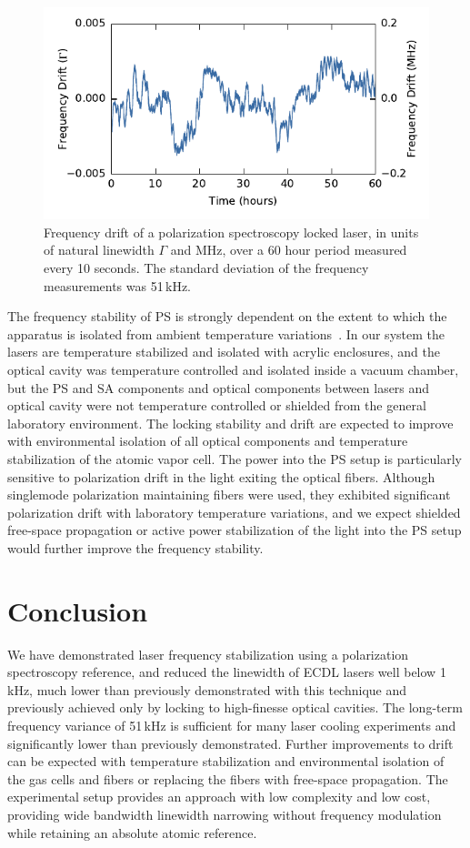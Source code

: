 \documentclass[10pt,letterpaper]{article}
\begin{document}
\begin{figure}[htbp]
\centering
\includegraphics{scholten_fig5.pdf}
\caption{Frequency drift of a polarization spectroscopy locked laser, in units of natural linewidth $\Gamma$ and MHz, over a 60 hour period measured every 10 seconds.
The standard deviation of the frequency measurements was 51\,kHz.}
\label{fig:drift}
\end{figure}

The frequency stability of PS is strongly dependent on the extent to which the apparatus is isolated from ambient temperature variations~\cite{yoshikawa_frequency_2003}.
In our system the lasers are temperature stabilized and isolated with acrylic enclosures, and the optical cavity was temperature controlled and isolated inside a vacuum chamber, but the PS and SA components and optical components between lasers and optical cavity were not temperature controlled or shielded from the general laboratory environment.
The locking stability and drift are expected to improve with environmental isolation of all optical components and temperature stabilization of the atomic vapor cell.
The power into the PS setup is particularly sensitive to polarization drift in the light exiting the optical fibers.
Although singlemode polarization maintaining fibers were used, they exhibited significant polarization drift with laboratory temperature variations, and we expect shielded free-space propagation or active power stabilization of the light into the PS setup would further improve the frequency stability.


\section{Conclusion}

We have demonstrated laser frequency stabilization using a polarization spectroscopy reference, and reduced the linewidth of ECDL lasers well below 1\,kHz, much lower than previously demonstrated with this technique and previously achieved only by locking to high-finesse optical cavities.
The long-term frequency variance of 51\,kHz is sufficient for many laser cooling experiments and significantly lower than previously demonstrated.
Further improvements to drift can be expected with temperature stabilization and environmental isolation of the gas cells and fibers or replacing the fibers with free-space propagation.
The experimental setup provides an approach with low complexity and low cost, providing wide bandwidth linewidth narrowing without frequency modulation while retaining an absolute atomic reference.
\end{document}
